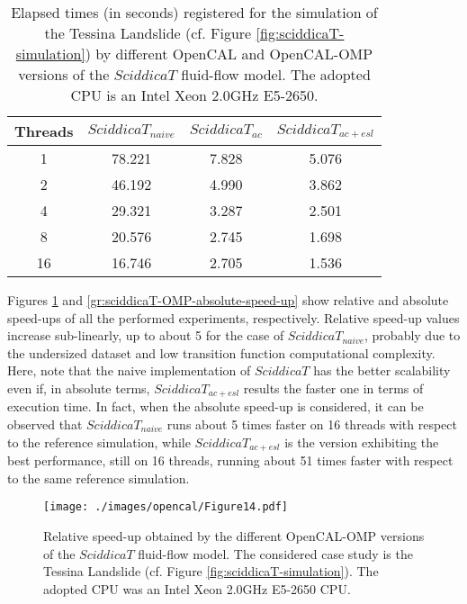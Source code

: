 \begin{table}
	\centering
	\begin{tabular}{cccc}
		\hline Threads & $SciddicaT_{naive}$ & $SciddicaT_{ac}$ &
		$SciddicaT_{ac+esl}$ \\ \hline 1 & 78.221 & 7.828 & 5.076\\ 2 &
		46.192 & 4.990 & 3.862\\ 4 & 29.321 & 3.287 & 2.501\\ 8 & 20.576
		& 2.745 & 1.698\\ 16 & 16.746 & 2.705 & 1.536\\ \hline
	\end{tabular}
	\caption{Elapsed times (in seconds) registered for the simulation of the
		Tessina Landslide (cf. Figure \ref{fig:sciddicaT-simulation}) by
		different OpenCAL and OpenCAL-OMP versions of the $SciddicaT$
		fluid-flow model. The adopted CPU is an Intel Xeon 2.0GHz E5-2650.}
	\label{tab:sciddicaT-OMP-execution-times}
\end{table}

Figures \ref{gr:sciddicaT-OMP-relative-speed-up} and
\ref{gr:sciddicaT-OMP-absolute-speed-up} show relative and
absolute speed-ups of all the performed experiments,
respectively. Relative speed-up values increase sub-linearly, up
to about 5 for the case of $SciddicaT_{naive}$, probably due to
the undersized dataset and low transition function computational
complexity. Here, note that the naive implementation of
$SciddicaT$ has the better scalability even if, in absolute terms,
$SciddicaT_{ac+esl}$ results the faster one in terms of execution
time. In fact, when the absolute speed-up is considered, it can be
observed that $SciddicaT_{naive}$ runs about 5 times faster on 16
threads with respect to the reference simulation, while
$SciddicaT_{ac+esl}$ is the version exhibiting the best
performance, still on 16 threads, running about 51 times faster
with respect to the same reference simulation.

\begin{figure}
	\begin{center}
		\texttt{[image: ./images/opencal/Figure14.pdf]}
		\caption{Relative speed-up obtained by the different OpenCAL-OMP versions of
			the $SciddicaT$ fluid-flow model. The considered case study is the
			Tessina Landslide (cf. Figure \ref{fig:sciddicaT-simulation}). The
			adopted CPU was an Intel Xeon 2.0GHz E5-2650 CPU.}
		\label{gr:sciddicaT-OMP-relative-speed-up}
	\end{center}
\end{figure}

